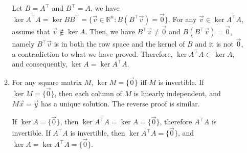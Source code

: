 \documentclass{article}
\begin{document}
\begin{enumerate}[1.]
\begin{enumerate}
Let $B = A^{\top}$ and $B^{\top} = A$, we have $\ker A^{\top}A = \ker BB^{\top} = \{\vec{v} \in \mathbb{R}^n : B(B^{\top}\vec{v}) = \vec{0}\}$. For any $\vec{v} \in \ker A^{\top}A$, assume that $\vec{v} \notin \ker A$. Then, we have $B^{\top} \vec{v} \neq \vec{0}$ and $B(B^{\top}\vec{v}) = \vec{0}$, namely $B^{\top}\vec{v}$ is in both the row space and the kernel of $B$ and it is not $\vec{0}$, a contradiction to what we have proved. Therefore, $\ker A^{\top}A \subset \ker A$, and consequently, $\ker A = \ker A^{\top}A$. \rQED

\item
For any square matrix $M$, $\ker M = \{\vec{0}\}$ iff $M$ is invertible. If $\ker M = \{\vec{0}\}$, then each column of $M$ is linearly independent, and $M\vec{x} = \vec{y}$ has a unique solution. The reverse proof is similar.

If $\ker A = \{\vec{0}\}$, then $\ker A^{\top}A = \ker A = \{\vec{0}\}$, therefore $A^{\top}A$ is invertible. If $A^{\top}A$ is invertible, then $\ker A^{\top}A = \{\vec{0}\}$, and $\ker A = \ker A^{\top}A = \{\vec{0}\}$. \rQED
\end{enumerate}
\end{enumerate}
\end{document}
